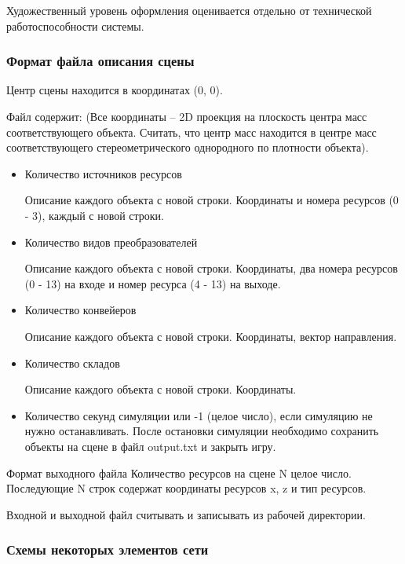 Художественный уровень оформления оценивается отдельно от технической работоспособности системы.	

\subsubsection*{Формат файла описания сцены}

Центр сцены находится в координатах (0, 0).

Файл содержит: (Все координаты -- 2D проекция на плоскость центра масс соответствующего объекта. Считать, что центр масс находится в центре масс соответствующего стереометрического однородного по плотности объекта).

\begin{itemize}
    \item Количество источников ресурсов
    
    Описание каждого объекта с новой строки. Координаты и номера ресурсов (0 - 3), каждый с новой строки.
    
    \item Количество видов преобразователей    
    
    Описание каждого объекта с новой строки. Координаты, два номера ресурсов (0 - 13) на входе и номер ресурса (4 - 13) на выходе.
    
    \item Количество конвейеров
    
    Описание каждого объекта с новой строки. Координаты, вектор направления.
    
    \item Количество складов
    
    Описание каждого объекта с новой строки. Координаты.
    
    \item Количество секунд симуляции или -1 (целое число), если симуляцию не нужно останавливать. После остановки симуляции необходимо сохранить объекты на сцене в файл output.txt и закрыть игру.        
\end{itemize}

Формат выходного файла
Количество ресурсов на сцене N целое число.
Последующие N строк содержат координаты ресурсов x, z и тип ресурсов.

Входной и выходной файл считывать и записывать из рабочей директории.

\subsubsection*{Схемы некоторых элементов сети}

